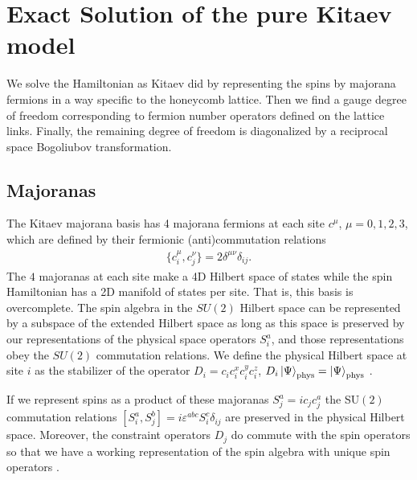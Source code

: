 \documentclass[aps,pra,preprint,groupedaddress]{revtex4-1}
\newcommand{\1}{\mathds{1}}
\begin{document}


\section{Exact Solution of the pure Kitaev model}

We solve the Hamiltonian as Kitaev did by representing the spins by majorana fermions in a way specific to the honeycomb lattice. Then we find a gauge degree of freedom corresponding to fermion number operators defined on the lattice links. Finally, the remaining degree of freedom is diagonalized by a reciprocal space Bogoliubov transformation.

\subsection{Majoranas}

The Kitaev majorana basis has 4 majorana fermions at each site $c^\mu$, $\mu = 0,1,2,3$, which are defined by their fermionic (anti)commutation relations
\begin{align}
\{c^\mu_i , c^\nu_j \} = 2 \delta^{\mu \nu} \delta_{ij}.
\end{align}
The $4$ majoranas at each site make a 4D Hilbert space of states while the spin Hamiltonian has a 2D manifold of states per site. That is, this basis is overcomplete. The spin algebra in the $SU(2)$ Hilbert space can be represented by a subspace of the extended Hilbert space as long as this space is preserved by our representations of the physical space operators $S^a_i$, and those representations obey the $SU(2)$ commutation relations. We define the physical Hilbert space at site $i$ as the stabilizer of the operator $D_i = c_i c_i^x c_i^y c_i^z$, $D_i \ket{\Psi}_{\textrm{phys}}=\ket{\Psi}_{\textrm{phys}}$ \cite{Baskaran,Kitaev}. 

If we represent spins as a product of these majoranas $S^a_j = i c_j c_j^a$ the SU$(2)$ commutation relations $[S^a_i,S^b_j] = i \varepsilon^{abc} S^c_i \delta_{ij} $ are preserved in the physical Hilbert space. %
Moreover, the constraint operators $D_j$ do commute with the spin operators so that we have a working representation of the spin algebra with unique spin operators \cite{Kitaev}.  %
\end{document}
